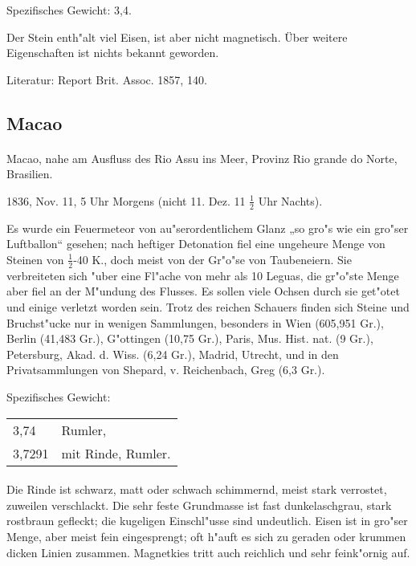 \documentclass[a4paper, 11pt, oneside]{article}
\begin{document}
Spezifisches Gewicht: 3,4.

Der Stein enth"alt viel Eisen, ist aber nicht magnetisch. Über weitere Eigenschaften ist nichts bekannt geworden.

\footnotesize
Literatur: Report Brit. Assoc. 1857, 140.

\subsection{Macao}
\normalsize
\paragraph{}
Macao, nahe am Ausfluss des Rio Assu ins Meer, Provinz Rio grande do Norte, Brasilien.

1836, Nov. 11, 5 Uhr Morgens (nicht 11. Dez. 11 $\frac{1}{2}$ Uhr Nachts).

Es wurde ein Feuermeteor von au"serordentlichem Glanz „so gro"s wie ein gro"ser Luftballon“ gesehen; nach heftiger Detonation fiel eine ungeheure Menge von Steinen von $\frac{1}{2}$-40 K., doch meist von der Gr"o"se von Taubeneiern. Sie verbreiteten sich "uber eine Fl"ache von mehr als 10 Leguas, die gr"o"ste Menge aber fiel an der M"undung des Flusses. Es sollen viele Ochsen durch sie get"otet und einige verletzt worden sein. Trotz des reichen Schauers finden sich Steine und Bruchst"ucke nur in wenigen Sammlungen, besonders in Wien (605,951 Gr.), Berlin (41,483 Gr.), G"ottingen (10,75 Gr.), Paris, Mus. Hist. nat. (9 Gr.), Petersburg, Akad. d. Wiss. (6,24 Gr.), Madrid, Utrecht, und in den Privatsammlungen von Shepard, v. Reichenbach, Greg (6,3 Gr.).

Spezifisches Gewicht:  
\begin{table}[!ht]
    \centering
    \begin{tabular}{l l}
        3,74 & Rumler,\\
        3,7291 & mit Rinde, Rumler.
    \end{tabular}
\end{table}
\paragraph{}
Die Rinde ist schwarz, matt oder schwach schimmernd, meist stark verrostet, zuweilen verschlackt. Die sehr feste Grundmasse ist fast dunkelaschgrau, stark rostbraun gefleckt; die kugeligen Einschl"usse sind undeutlich. Eisen ist in gro"ser Menge, aber meist fein eingesprengt; oft h"auft es sich zu geraden oder krummen dicken Linien zusammen. Magnetkies tritt auch reichlich und sehr feink"ornig auf.
\end{document}
